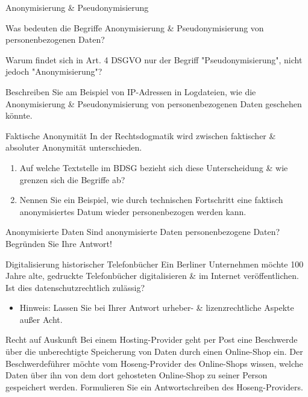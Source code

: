 \documentclass{exercisesheet}
\begin{document}
  \begin{exercise}{Anonymisierung \& Pseudonymisierung}
      \item Was bedeuten die Begriffe Anonymisierung \& Pseudonymisierung von personenbezogenen Daten?
      \item Warum findet sich in Art. 4 DSGVO nur der Begriff "Pseudonymisierung", nicht jedoch "Anonymisierung"?
      \item Beschreiben Sie am Beispiel von IP-Adressen in Logdateien, wie die Anonymisierung \& Pseudonymisierung von personenbezogenen Daten geschehen könnte.
  \end{exercise}

  \begin{exercise*}{Faktische Anonymität}
    In der Rechtsdogmatik wird zwischen faktischer \& absoluter Anonymität unterschieden.
    \begin{enumerate}
      \item Auf welche Textstelle im BDSG bezieht sich diese Unterscheidung \& wie grenzen sich die Begriffe ab?
      \item Nennen Sie ein Beispiel, wie durch technischen Fortschritt eine faktisch anonymisiertes Datum wieder personenbezogen werden kann.
    \end{enumerate}
  \end{exercise*}

  \begin{exercise*}{Anonymisierte Daten}
    Sind anonymisierte Daten personenbezogene Daten? Begründen Sie Ihre Antwort!
  \end{exercise*}

  \begin{exercise*}{Digitalisierung historischer Telefonbücher}
    Ein Berliner Unternehmen möchte 100 Jahre alte, gedruckte Telefonbücher digitalisieren \& im Internet veröffentlichen. Ist dies datenschutzrechtlich zulässig?
    \begin{itemize}
      \item Hinweis: Lassen Sie bei Ihrer Antwort urheber- \& lizenzrechtliche Aspekte außer Acht.
    \end{itemize}
  \end{exercise*}

  \begin{exercise*}{Recht auf Auskunft}
    Bei einem Hosting-Provider geht per Post eine Beschwerde über die unberechtigte Speicherung von Daten durch einen Online-Shop ein. Der Beschwerdeführer möchte vom Hoseng-Provider des Online-Shops wissen, welche Daten über ihn von dem dort gehosteten Online-Shop zu seiner Person gespeichert werden. Formulieren Sie ein Antwortschreiben des Hoseng-Providers.
  \end{exercise*}
\end{document}
